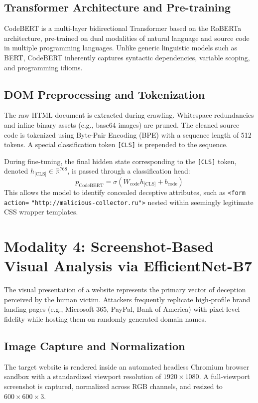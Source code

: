 \subsection{Transformer Architecture and Pre-training}
CodeBERT is a multi-layer bidirectional Transformer based on the RoBERTa architecture, pre-trained on dual modalities of natural language and source code in multiple programming languages. Unlike generic linguistic models such as BERT, CodeBERT inherently captures syntactic dependencies, variable scoping, and programming idioms.

\subsection{DOM Preprocessing and Tokenization}
The raw HTML document is extracted during crawling. Whitespace redundancies and inline binary assets (e.g., base64 images) are pruned. The cleaned source code is tokenized using Byte-Pair Encoding (BPE) with a sequence length of 512 tokens. A special classification token \texttt{[CLS]} is prepended to the sequence.

During fine-tuning, the final hidden state corresponding to the \texttt{[CLS]} token, denoted $h_{\text{[CLS]}} \in \mathbb{R}^{768}$, is passed through a classification head:
\begin{equation}
p_{\text{CodeBERT}} = \sigma\left(W_{\text{code}} h_{\text{[CLS]}} + b_{\text{code}}\right)
\label{eq:codebert}
\end{equation}
This allows the model to identify concealed deceptive attributes, such as \texttt{<form} \texttt{action=} \allowbreak \texttt{"http://malicious-collector.ru">} nested within seemingly legitimate CSS wrapper templates.

\section{Modality 4: Screenshot-Based Visual Analysis via EfficientNet-B7}
The visual presentation of a website represents the primary vector of deception perceived by the human victim. Attackers frequently replicate high-profile brand landing pages (e.g., Microsoft 365, PayPal, Bank of America) with pixel-level fidelity while hosting them on randomly generated domain names.

\subsection{Image Capture and Normalization}
The target website is rendered inside an automated headless Chromium browser sandbox with a standardized viewport resolution of $1920 \times 1080$. A full-viewport screenshot is captured, normalized across RGB channels, and resized to $600 \times 600 \times 3$.

